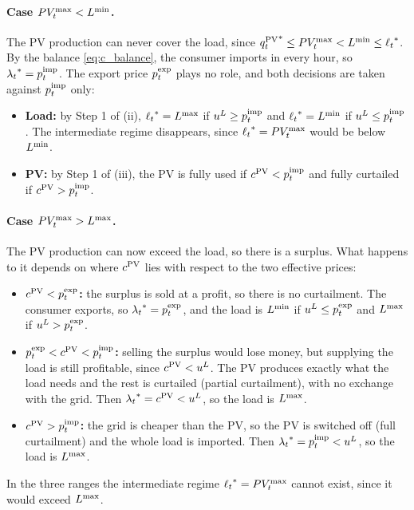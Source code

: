 \paragraph{Case $PV_{t}^{\max} < L^{\min}$.}
The PV production can never cover the load, since
${q^{\mathrm{PV}}_{t}}^* \leq PV_{t}^{\max} < L^{\min} \leq {\ell_{t}}^*$. By the balance \eqref{eq:c_balance}, the
consumer imports in every hour, so ${\lambda_{t}}^* = p^{\mathrm{imp}}_{t}$. The export price $p^{\mathrm{exp}}_{t}$ plays no
role, and both decisions are taken against $p^{\mathrm{imp}}_{t}$ only:
\begin{itemize}
    \item \textbf{Load:} by Step 1 of (ii), ${\ell_{t}}^* = L^{\max}$ if $u^{L} \geq p^{\mathrm{imp}}_{t}$ and
    ${\ell_{t}}^* = L^{\min}$ if $u^{L} \leq p^{\mathrm{imp}}_{t}$. The intermediate regime disappears, since
    ${\ell_{t}}^* = PV_{t}^{\max}$ would be below $L^{\min}$.
    \item \textbf{PV:} by Step 1 of (iii), the PV is fully used if $c^{\mathrm{PV}} < p^{\mathrm{imp}}_{t}$ and fully
    curtailed if $c^{\mathrm{PV}} > p^{\mathrm{imp}}_{t}$.
\end{itemize}

\paragraph{Case $PV_{t}^{\max} > L^{\max}$.}
The PV production can now exceed the load, so there is a surplus. What happens to it depends
on where $c^{\mathrm{PV}}$ lies with respect to the two effective prices:
\begin{itemize}
    \item \textbf{$c^{\mathrm{PV}} < p^{\mathrm{exp}}_{t}$:} the surplus is sold at a profit, so there is no
    curtailment. The consumer exports, so ${\lambda_{t}}^* = p^{\mathrm{exp}}_{t}$, and the load is $L^{\min}$ if
    $u^{L} \leq p^{\mathrm{exp}}_{t}$ and $L^{\max}$ if $u^{L} > p^{\mathrm{exp}}_{t}$.
    \item \textbf{$p^{\mathrm{exp}}_{t} < c^{\mathrm{PV}} < p^{\mathrm{imp}}_{t}$:} selling the surplus would lose money, but supplying
    the load is still profitable, since $c^{\mathrm{PV}} < u^{L}$. The PV produces exactly what the load
    needs and the rest is curtailed (partial curtailment), with no exchange with the grid.
    Then ${\lambda_{t}}^* = c^{\mathrm{PV}} < u^{L}$, so the load is $L^{\max}$.
    \item \textbf{$c^{\mathrm{PV}} > p^{\mathrm{imp}}_{t}$:} the grid is cheaper than the PV, so the PV is switched off
    (full curtailment) and the whole load is imported. Then ${\lambda_{t}}^* = p^{\mathrm{imp}}_{t} < u^{L}$, so the
    load is $L^{\max}$.
\end{itemize}
In the three ranges the intermediate regime ${\ell_{t}}^* = PV_{t}^{\max}$ cannot exist, since it would
exceed $L^{\max}$.


